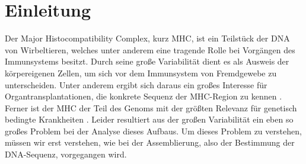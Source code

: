 \chapter{Einleitung} \raggedbottom 
Der Major Histocompatibility Complex, kurz MHC, ist ein Teilstück der DNA von Wirbeltieren, welches unter anderem eine tragende Rolle bei Vorgängen des Immunsystems besitzt. Durch seine große Variabilität dient es als Ausweis der körpereigenen Zellen, um sich vor dem Immunsystem von Fremdgewebe zu unterscheiden. Unter anderem ergibt sich daraus ein großes Interesse für Organtransplantationen, die konkrete Sequenz der MHC-Region zu kennen \cite{Opelz1999HLACA}. Ferner ist der MHC der Teil des Genoms mit der größten Relevanz für genetisch bedingte Krankheiten \cite{tiwari2012hla}. 
Leider resultiert aus der großen Variabilität ein eben so großes Problem bei der Analyse dieses Aufbaus. Um dieses Problem zu verstehen, müssen wir erst verstehen, wie bei der Assemblierung, also der Bestimmung der DNA-Sequenz, vorgegangen wird.\\


